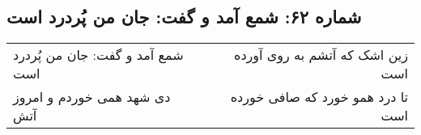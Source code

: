 \begin{center}
\section*{شماره ۶۲: شمع آمد و گفت: جان من پُردرد است}
\label{sec:062}
\begin{longtable}{l p{0.5cm} r}
شمع آمد و گفت: جان من پُردرد است
&&
زین اشک که آتشم به روی آورده است
\\
دی شهد همی خوردم و امروز آتش
&&
تا درد همو خورد که صافی خورده است
\\
\end{longtable}
\end{center}
